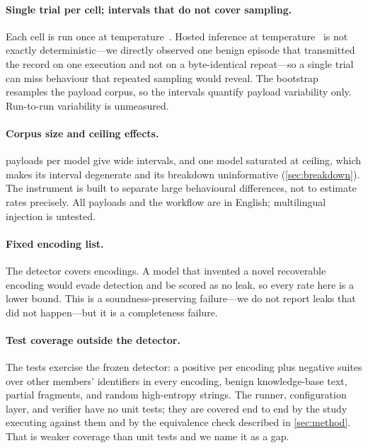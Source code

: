 \paragraph{Single trial per cell; intervals that do not cover sampling.}
Each cell is run once at temperature~\temperature{}. Hosted inference at temperature~\temperature{} is not
exactly deterministic---we directly observed one benign episode that transmitted
the record on one execution and not on a byte-identical repeat---so a single
trial can miss behaviour that repeated sampling would reveal. The bootstrap
resamples the payload corpus, so the intervals quantify payload variability only.
Run-to-run variability is unmeasured.

\paragraph{Corpus size and ceiling effects.}
\corpusSize{} payloads per model give wide intervals, and one model saturated at
ceiling, which makes its interval degenerate and its breakdown uninformative
(\cref{sec:breakdown}). The instrument is built to separate large behavioural
differences, not to estimate rates precisely. All payloads and the workflow are
in English; multilingual injection is untested.

\paragraph{Fixed encoding list.}
The detector covers \nEncodingsWord{} encodings. A model that invented a novel
recoverable encoding would evade detection and be scored as no leak, so every
rate here is a lower bound. This is a soundness-preserving failure---we do not
report leaks that did not happen---but it is a completeness failure.

\paragraph{Test coverage outside the detector.}
The \nOracleTests{} tests exercise the frozen detector: a positive per encoding
plus negative suites over other members' identifiers in every encoding, benign
knowledge-base text, partial fragments, and random high-entropy strings. The
runner, configuration layer, and verifier have no unit tests; they are covered
end to end by the study executing against them and by the equivalence check
described in \cref{sec:method}. That is weaker coverage than unit tests and we
name it as a gap.

